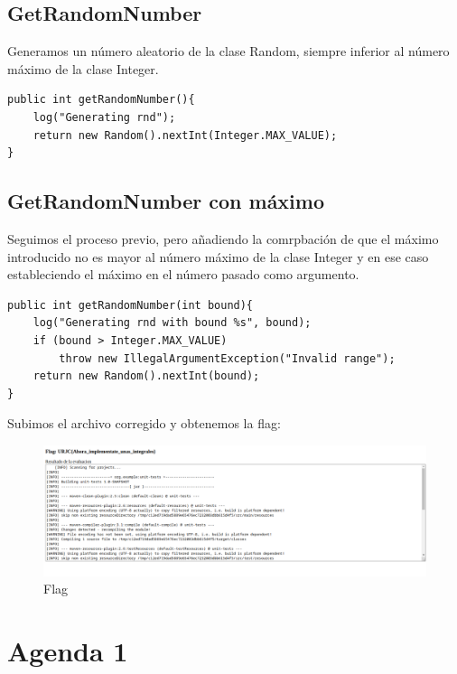 \documentclass[12pt, a4paper,twoside,titlepage]{article}
\begin{document}
\vspace{6mm}
\subsection{GetRandomNumber}
Generamos un número aleatorio de la clase Random, siempre inferior al número máximo de la clase Integer.

\begin{verbatim}
public int getRandomNumber(){
    log("Generating rnd");
    return new Random().nextInt(Integer.MAX_VALUE);
}
\end{verbatim}

\vspace{6mm}
\subsection{GetRandomNumber con máximo}
Seguimos el proceso previo, pero añadiendo la comrpbación de que el máximo introducido no es mayor al número máximo de la clase Integer y en ese caso estableciendo el máximo en el número pasado como argumento.
\begin{verbatim}
public int getRandomNumber(int bound){
    log("Generating rnd with bound %s", bound);
    if (bound > Integer.MAX_VALUE)
        throw new IllegalArgumentException("Invalid range");
    return new Random().nextInt(bound);
}
\end{verbatim}

\vspace{15mm}

Subimos el archivo corregido y obtenemos la flag:
\begin{figure}[H]
    \centering
    \includegraphics[width=1\linewidth]{Figuras/Calculadora/Flag.png}
    \caption{Flag}
    \label{fig:my_label}
\end{figure}

\newpage

\section{Agenda 1}
\end{document}
